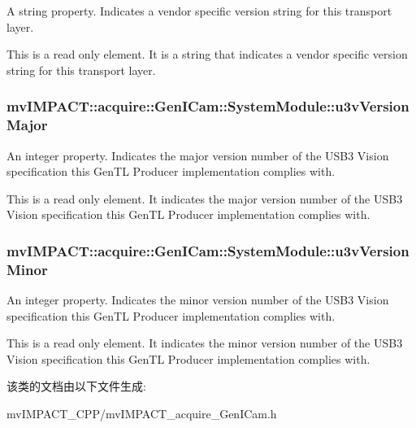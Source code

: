 A string property. Indicates a vendor specific version string for this transport layer. 

This is a read only element. It is a string that indicates a vendor specific version string for this transport layer. \hypertarget{classmv_i_m_p_a_c_t_1_1acquire_1_1_gen_i_cam_1_1_system_module_a21d87726103ba795abd382f948688adc}{
\subsubsection[{u3v\+Version\+Major}]{ mv\+I\+M\+P\+A\+C\+T\+::acquire\+::\+Gen\+I\+Cam\+::\+System\+Module\+::u3v\+Version\+Major}}\label{classmv_i_m_p_a_c_t_1_1acquire_1_1_gen_i_cam_1_1_system_module_a21d87726103ba795abd382f948688adc}


An integer property. Indicates the major version number of the U\+S\+B3 Vision specification this Gen\+T\+L Producer implementation complies with. 

This is a read only element. It indicates the major version number of the U\+S\+B3 Vision specification this Gen\+T\+L Producer implementation complies with. \hypertarget{classmv_i_m_p_a_c_t_1_1acquire_1_1_gen_i_cam_1_1_system_module_a09cc58892ace4b142df7c60594a326c9}{
\subsubsection[{u3v\+Version\+Minor}]{ mv\+I\+M\+P\+A\+C\+T\+::acquire\+::\+Gen\+I\+Cam\+::\+System\+Module\+::u3v\+Version\+Minor}}\label{classmv_i_m_p_a_c_t_1_1acquire_1_1_gen_i_cam_1_1_system_module_a09cc58892ace4b142df7c60594a326c9}


An integer property. Indicates the minor version number of the U\+S\+B3 Vision specification this Gen\+T\+L Producer implementation complies with. 

This is a read only element. It indicates the minor version number of the U\+S\+B3 Vision specification this Gen\+T\+L Producer implementation complies with. 

该类的文档由以下文件生成\+:\begin{DoxyCompactItemize}
\item 
mv\+I\+M\+P\+A\+C\+T\+\_\+\+C\+P\+P/mv\+I\+M\+P\+A\+C\+T\+\_\+acquire\+\_\+\+Gen\+I\+Cam.\+h\end{DoxyCompactItemize}
